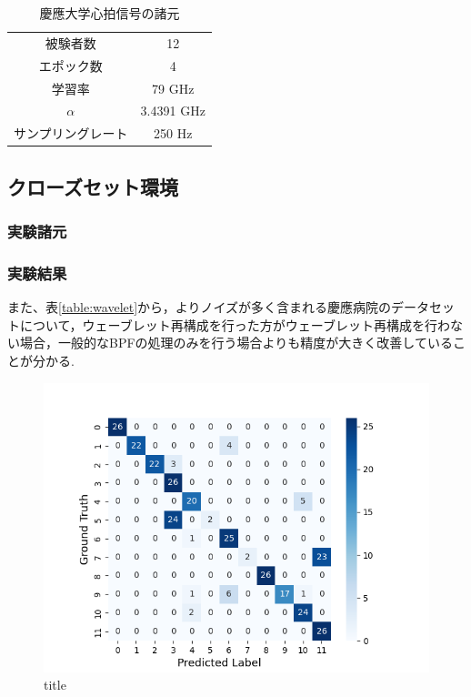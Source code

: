 \begin{table}[H]
  \caption{慶應大学心拍信号の諸元}
  \centering
  \begin{tabular}{cc}
  \hline
  被験者数 & 12 \\
  エポック数 & 4 \\
  学習率 & 79 GHz \\
  $\alpha$ & 3.4391 GHz \\
  サンプリングレート & 250 Hz \\
  \hline
  \end{tabular}
  \label{table:keio_hospital}
  \end{table}

\subsection{クローズセット環境}
\subsubsection{実験諸元}
\subsubsection{実験結果}
また、表\ref{table:wavelet}から，よりノイズが多く含まれる慶應病院のデータセットについて，ウェーブレット再構成を行った方がウェーブレット再構成を行わない場合，一般的なBPFの処理のみを行う場合よりも精度が大きく改善していることが分かる.

\begin{figure}[H]
\begin{center}
\includegraphics[width=\linewidth]{./fig/noisy_dataset/cross_val_Fold0_close.png}
\end{center}
\caption{title}
\end{figure}

